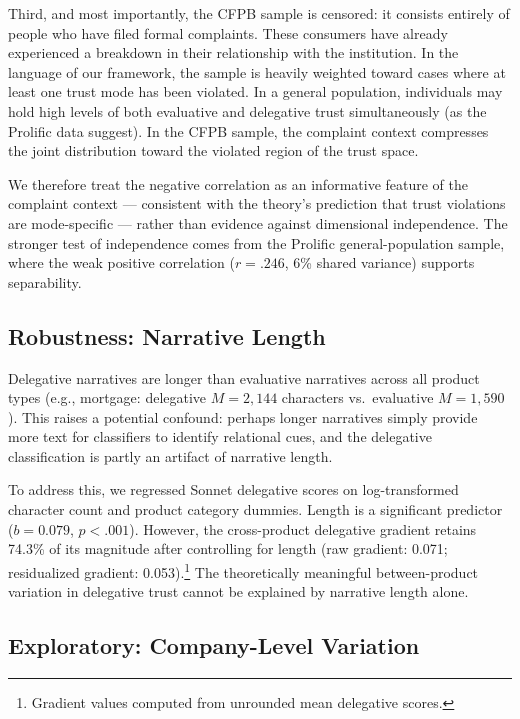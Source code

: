 Third, and most importantly, the CFPB sample is censored: it consists entirely of people who have filed formal complaints. These consumers have already experienced a breakdown in their relationship with the institution. In the language of our framework, the sample is heavily weighted toward cases where at least one trust mode has been violated. In a general population, individuals may hold high levels of both evaluative and delegative trust simultaneously (as the Prolific data suggest). In the CFPB sample, the complaint context compresses the joint distribution toward the violated region of the trust space.

We therefore treat the negative correlation as an informative feature of the complaint context --- consistent with the theory's prediction that trust violations are mode-specific --- rather than evidence against dimensional independence. The stronger test of independence comes from the Prolific general-population sample, where the weak positive correlation ($r = .246$, 6\% shared variance) supports separability.

\subsection{Robustness: Narrative Length}

Delegative narratives are longer than evaluative narratives across all product types (e.g., mortgage: delegative $M = 2{,}144$ characters vs.\ evaluative $M = 1{,}590$). This raises a potential confound: perhaps longer narratives simply provide more text for classifiers to identify relational cues, and the delegative classification is partly an artifact of narrative length.

To address this, we regressed Sonnet delegative scores on log-transformed character count and product category dummies. Length is a significant predictor ($b = 0.079$, $p < .001$). However, the cross-product delegative gradient retains 74.3\% of its magnitude after controlling for length (raw gradient: 0.071; residualized gradient: 0.053).\footnote{Gradient values computed from unrounded mean delegative scores.} The theoretically meaningful between-product variation in delegative trust cannot be explained by narrative length alone.

\subsection{Exploratory: Company-Level Variation}

